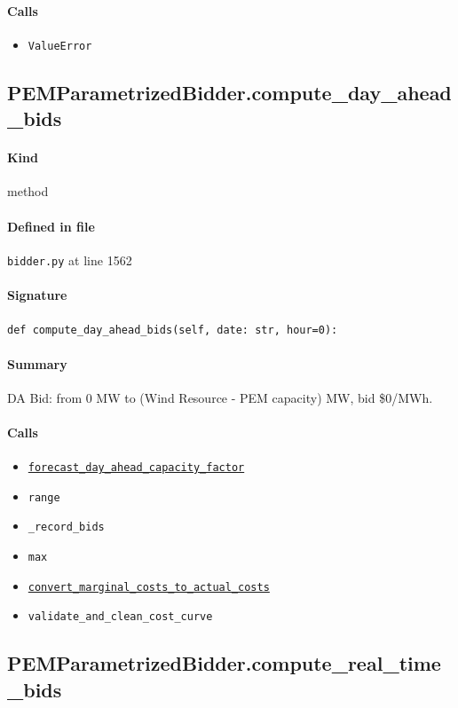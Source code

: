 \documentclass[11pt]{report}
\begin{document}
\paragraph{Calls}
\begin{itemize}[leftmargin=*]
  \item \texttt{ValueError}
\end{itemize}
\subsection{PEMParametrizedBidder.compute\_day\_ahead\_bids}
\label{def:bidder.py:PEMParametrizedBidder.compute_day_ahead_bids:L1562}
\paragraph{Kind} method
\paragraph{Defined in file} \texttt{bidder.py} at line 1562
\paragraph{Signature} \texttt{def compute\_day\_ahead\_bids(self, date: str, hour=0):}
\paragraph{Summary} DA Bid: from 0 MW to (Wind Resource - PEM capacity) MW, bid \$0/MWh.
\paragraph{Calls}
\begin{itemize}[leftmargin=*]
  \item \hyperref[def:forecaster.py:PerfectForecaster.forecast_day_ahead_capacity_factor:L790]{\texttt{forecast\_day\_ahead\_capacity\_factor}}
  \item \texttt{range}
  \item \texttt{\_record\_bids}
  \item \texttt{max}
  \item \hyperref[def:utils.py:convert_marginal_costs_to_actual_costs:L15]{\texttt{convert\_marginal\_costs\_to\_actual\_costs}}
  \item \texttt{validate\_and\_clean\_cost\_curve}
\end{itemize}
\subsection{PEMParametrizedBidder.compute\_real\_time\_bids}
\label{def:bidder.py:PEMParametrizedBidder.compute_real_time_bids:L1625}
\end{document}

